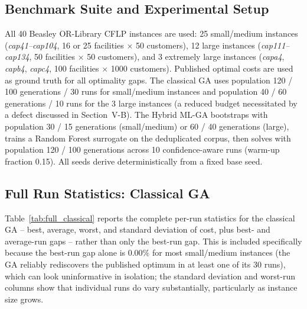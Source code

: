 \documentclass[conference]{IEEEtran}
\begin{document}
\subsection{Benchmark Suite and Experimental Setup}

All 40 Beasley OR-Library CFLP instances are used: 25 small/medium instances
(\emph{cap41--cap104}, 16 or 25 facilities $\times$ 50 customers), 12 large
instances (\emph{cap111--cap134}, 50 facilities $\times$ 50 customers), and 3
extremely large instances (\emph{capa4}, \emph{capb4}, \emph{capc4}, 100
facilities $\times$ 1000 customers). Published optimal costs are used as
ground truth for all optimality gaps. The classical GA uses population 120 /
100 generations / 30 runs for small/medium instances and population 40 / 60
generations / 10 runs for the 3 large instances (a reduced budget necessitated
by a defect discussed in Section~V-B). The Hybrid ML-GA bootstraps with
population 30 / 15 generations (small/medium) or 60 / 40 generations (large),
trains a Random Forest surrogate on the deduplicated corpus, then solves with
population 120 / 100 generations across 10 confidence-aware runs (warm-up
fraction 0.15). All seeds derive deterministically from a fixed base seed.

\subsection{Full Run Statistics: Classical GA}

Table~\ref{tab:full_classical} reports the complete per-run statistics for the
classical GA -- best, average, worst, and standard deviation of cost, plus
best- and average-run gaps -- rather than only the best-run gap. This is
included specifically because the best-run gap alone is $0.00\%$ for most
small/medium instances (the GA reliably rediscovers the published optimum in
at least one of its 30 runs), which can look uninformative in isolation; the
standard deviation and worst-run columns show that individual runs do vary
substantially, particularly as instance size grows.
\end{document}
